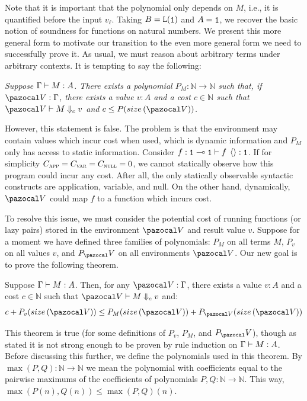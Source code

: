 Note that it is important that the polynomial only depends on $M$, i.e., it is quantified before the input $v_\ell$. Taking $B = \tplist{\tpunit}$ and $A = \tpunit$, we recover the basic notion of soundness for \lfplplus functions on natural numbers. We present this more general form to motivate our transition to the even more general form we need to successfully prove it. As usual, we must reason about arbitrary terms under arbitrary contexts. It is tempting to say the following:
\begin{center}
\parbox{.9\linewidth}{
  \it
Suppose $\Gamma \vdash M : A$. There exists a polynomial $P_M : \mathbb N \to \mathbb N$ such that, if $\env : \Gamma$, there exists a value $v : A$ and a cost $c \in \mathbb N$ such that $\evals{\env}{M}{c}{v}$ and $c \le P(\envsize{\env})$.
}
\end{center}
However, this statement is false. The problem is that the environment may contain values which incur cost when used, which is dynamic information and $P_M$ only has access to static information. Consider $\types{f : \tparr{\tpunit}{\tpunit}}{\tmapp{f}{\tmnull}}{\tpunit}$. If for simplicity $C_{\textsc{app}} = C_{\textsc{var}} = C_{\textsc{null}} = 0$, we cannot statically observe how this program could incur any cost. After all, the only statically observable syntactic constructs are application, variable, and null. On the other hand, dynamically, $\env$ could map $f$ to a function which incurs cost.

To resolve this issue, we must consider the potential cost of running functions (or lazy pairs) stored in the environment $\env$ and result value $v$. Suppose for a moment we have defined three families of polynomials: $P_M$ on all terms $M$, $P_v$ on all values $v$, and $P_\env$ on all environments $\env$. Our new goal is to prove the following theorem.

\begin{theorem}
\label{thm:soundness-general}
Suppose $\Gamma \vdash M : A$. Then, for any $\env : \Gamma$, there exists a value $v : A$ and a cost $c \in \mathbb N$ such that $\evals{\env}{M}{c}{v}$ and:
\[ c + P_v(\envsize{\env}) \le P_M(\envsize{\env}) + P_{\env}(\envsize{\env}) \]
\end{theorem}

This theorem is true (for some definitions of $P_v$, $P_M$, and $P_\env$), though as stated it is not strong enough to be proven by rule induction on $\Gamma \vdash M : A$. Before discussing this further, we define the polynomials used in this theorem. By $\max(P,Q) : \mathbb N \to \mathbb N$ we mean the polynomial with coefficients equal to the pairwise maximums of the coefficients of polynomials $P,Q : \mathbb N \to \mathbb N$. This way, $\max(P(n), Q(n)) \le \max(P,Q)(n)$.

